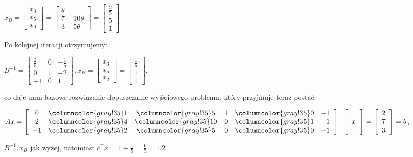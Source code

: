 \documentclass[licencjacka]{pracamgr}
\begin{document}
\centerline{$x_B=\left[\begin{array}{c}x_3\\x_5\\x_0\end{array}\right]=\left[\begin{array}{c}\theta\\7-10\theta\\3-5\theta\end{array}\right]=\left[\begin{array}{c}\frac{2}{5}\\5\\1\end{array}\right]$}\newline
Po kolejnej iteracji otrzymujemy:\newline
\centerline{$ B^{-1}=\left[\begin{array}{ccc}\frac{2}{5}&0&-\frac{1}{5}\\0&1&-2\\-1&0&1\end{array}\right],x_B=\left[\begin{array}{c}x_3\\x_5\\x_2\end{array}\right]=
\left[\begin{array}{c}\frac{1}{5}\\1\\1\end{array}\right]$,}\newline
co daje nam bazowe rozwiązanie dopuszczalne wyjściowego problemu, który przyjmuje teraz postać:\newline
\centerline{$
Ax=\left[\begin{array}{c>{\columncolor{gray!35}}c>{\columncolor{gray!35}}cc>{\columncolor{gray!35}}ccc}
 0&1&5&1&0&-1\\
 2&4&10&0&1&-1\\
 -1&2&5&0&0&-1\\
\end{array}\right]\cdot\left[\begin{array}{c}\\x\\\\\end{array}\right]=\left[\begin{array}{c}2\\7\\3\\\end{array}\right]=b$,}\newline
\centerline{$B^{-1},x_B$ jak wyżej, natomiast $c^{\top}x=1+\frac{1}{5}=\frac{6}{5}=1.2$}\newline
\end{document}
